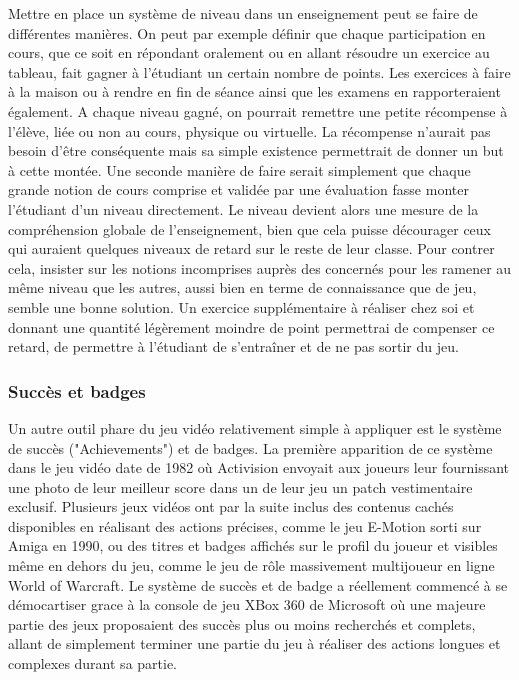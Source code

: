 Mettre en place un système de niveau dans un enseignement peut se faire de différentes manières. On peut par exemple définir que chaque participation en cours, que ce soit en répondant oralement ou en allant résoudre un exercice au tableau, fait gagner à l'étudiant un certain nombre de points. Les exercices à faire à la maison ou à rendre en fin de séance ainsi que les examens en rapporteraient également. A chaque niveau gagné, on pourrait remettre une petite récompense à l'élève, liée ou non au cours, physique ou virtuelle. La récompense n'aurait pas besoin d'être conséquente mais sa simple existence permettrait de donner un but à cette montée. Une seconde manière de faire serait simplement que chaque grande notion de cours comprise et validée par une évaluation fasse monter l'étudiant d'un niveau directement. Le niveau devient alors une mesure de la compréhension globale de l'enseignement, bien que cela puisse décourager ceux qui auraient quelques niveaux de retard sur le reste de leur classe. Pour contrer cela, insister sur les notions incomprises auprès des concernés pour les ramener au même niveau que les autres, aussi bien en terme de connaissance que de jeu, semble une bonne solution. Un exercice supplémentaire à réaliser chez soi et donnant une quantité légèrement moindre de point  permettrai de compenser ce retard, de permettre à l'étudiant de s'entraîner et de ne pas sortir du jeu. 

\subsubsection{Succès et badges}
Un autre outil phare du jeu vidéo relativement simple à appliquer est le système de succès ("Achievements") et de badges. La première apparition de ce système dans le jeu vidéo date de 1982 où Activision envoyait aux joueurs leur fournissant une photo de leur meilleur score dans un de leur jeu un patch vestimentaire exclusif. Plusieurs jeux vidéos ont par la suite inclus des contenus cachés disponibles en réalisant des actions précises, comme le jeu E-Motion sorti sur Amiga en 1990, ou des titres et badges affichés sur le profil du joueur et visibles même en dehors du jeu, comme le jeu de rôle massivement multijoueur en ligne World of Warcraft. Le système de succès et de badge a réellement commencé à se démocartiser grace à la console de jeu XBox 360 de Microsoft où une majeure partie des jeux proposaient des succès plus ou moins recherchés et complets, allant de simplement terminer une partie du jeu à réaliser des actions longues et complexes durant sa partie. \par

